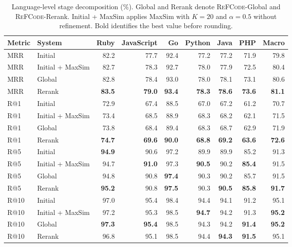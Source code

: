 \documentclass[11pt]{article}
\newcommand{\method}{\textsc{ReFCode}}
\begin{document}
\begin{table}[!t]
  \centering
  \scriptsize
  \setlength{\tabcolsep}{3.5pt}
  \begin{tabular}{llrrrrrrr}
    \toprule
    Metric & System & Ruby & JavaScript & Go & Python & Java & PHP & Macro \\
    \midrule
    MRR & Initial & 82.2 & 77.7 & 92.4 & 77.2 & 77.2 & 71.9 & 79.8 \\
    MRR & Initial + MaxSim & 82.7 & 78.3 & 92.7 & 78.0 & 77.9 & 72.5 & 80.4 \\
    MRR & Global & 82.8 & 78.4 & 93.0 & 78.0 & 78.1 & 73.1 & 80.6 \\
    MRR & Rerank & \textbf{83.5} & \textbf{79.0} & \textbf{93.4} & \textbf{78.3} & \textbf{78.6} & \textbf{73.6} & \textbf{81.1} \\
    R@1 & Initial & 72.9 & 67.4 & 88.5 & 67.0 & 67.2 & 61.2 & 70.7 \\
    R@1 & Initial + MaxSim & 73.4 & 68.5 & 88.9 & 68.3 & 68.2 & 62.1 & 71.5 \\
    R@1 & Global & 73.8 & 68.4 & 89.4 & 68.3 & 68.7 & 62.9 & 71.9 \\
    R@1 & Rerank & \textbf{74.7} & \textbf{69.6} & \textbf{90.0} & \textbf{68.8} & \textbf{69.2} & \textbf{63.6} & \textbf{72.6} \\
    R@5 & Initial & \textbf{94.9} & 90.6 & 97.2 & 89.9 & 89.9 & 85.2 & 91.3 \\
    R@5 & Initial + MaxSim & 94.7 & \textbf{91.0} & 97.3 & \textbf{90.5} & 90.2 & \textbf{85.4} & 91.5 \\
    R@5 & Global & 94.8 & 90.8 & \textbf{97.4} & 90.3 & 90.2 & 85.7 & 91.5 \\
    R@5 & Rerank & \textbf{95.2} & 90.8 & \textbf{97.5} & 90.3 & \textbf{90.5} & \textbf{85.8} & \textbf{91.7} \\
    R@10 & Initial & 97.0 & 95.4 & 98.4 & 94.4 & 94.1 & 91.2 & 95.1 \\
    R@10 & Initial + MaxSim & 97.2 & 95.3 & 98.5 & \textbf{94.7} & 94.2 & 91.3 & \textbf{95.2} \\
    R@10 & Global & \textbf{97.3} & \textbf{95.4} & 98.5 & 94.3 & 94.2 & \textbf{91.4} & \textbf{95.2} \\
    R@10 & Rerank & 96.8 & 95.1 & 98.5 & 94.4 & \textbf{94.3} & \textbf{91.5} & 95.1 \\
    \bottomrule
  \end{tabular}
  \caption{Language-level stage decomposition (\%). Global and Rerank denote \method{}-Global and \method{}-Rerank. Initial + MaxSim applies MaxSim with \(K=20\) and \(\alpha=0.5\) without refinement. Bold identifies the best value before rounding.}
  \label{tab:component_language_details}
\end{table}
\end{document}
